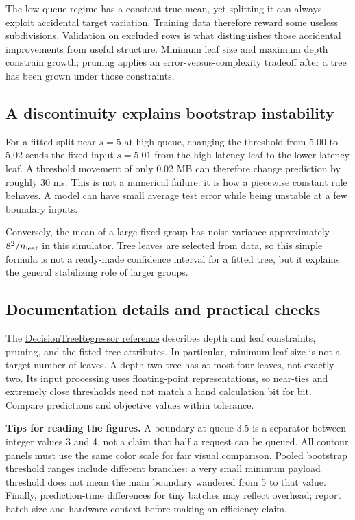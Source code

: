 The low-queue regime has a constant true mean, yet splitting it can always exploit accidental target variation.
Training data therefore reward some useless subdivisions. Validation on excluded rows is what distinguishes
those accidental improvements from useful structure. Minimum leaf size and maximum depth constrain growth;
pruning applies an error-versus-complexity tradeoff after a tree has been grown under those constraints.

\subsection*{A discontinuity explains bootstrap instability}
For a fitted split near $s=5$ at high queue, changing the threshold from 5.00 to 5.02 sends the fixed input
$s=5.01$ from the high-latency leaf to the lower-latency leaf. A threshold movement of only 0.02 MB can therefore
change prediction by roughly 30 ms. This is not a numerical failure: it is how a piecewise constant rule behaves.
A model can have small average test error while being unstable at a few boundary inputs.

Conversely, the mean of a large fixed group has noise variance approximately $8^2/n_{\rm leaf}$ in this simulator.
Tree leaves are selected from data, so this simple formula is not a ready-made confidence interval for a fitted tree,
but it explains the general stabilizing role of larger groups.

\subsection*{Documentation details and practical checks}
The \href{https://scikit-learn.org/1.8/modules/generated/sklearn.tree.DecisionTreeRegressor.html}{DecisionTreeRegressor reference}
describes depth and leaf constraints, pruning, and the fitted tree attributes. In particular, minimum leaf size
is not a target number of leaves. A depth-two tree has at most four leaves, not exactly two.
Its input processing uses floating-point representations, so near-ties and extremely close thresholds need not
match a hand calculation bit for bit. Compare predictions and objective values within tolerance.

\textbf{Tips for reading the figures.} A boundary at queue 3.5 is a separator between integer values 3 and 4,
not a claim that half a request can be queued. All contour panels must use the same color scale for fair visual comparison.
Pooled bootstrap threshold ranges include different branches: a very small minimum payload threshold does not
mean the main boundary wandered from 5 to that value. Finally, prediction-time differences for tiny batches may
reflect overhead; report batch size and hardware context before making an efficiency claim.


